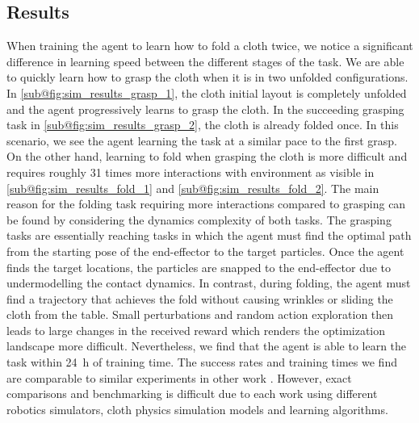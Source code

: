 \documentclass[\home/main.tex]{subfiles}
\begin{document}
\subsection{Results}
When training the agent to learn how to fold a cloth twice, we notice a significant difference in learning speed between the different stages of the task. We are able to quickly learn how to grasp the cloth when it is in two unfolded configurations. In \cref{sub@fig:sim_results_grasp_1}, the cloth initial layout is completely unfolded and the agent progressively learns to grasp the cloth. In the succeeding grasping task in \cref{sub@fig:sim_results_grasp_2}, the cloth is already folded once. In this scenario, we see the agent learning the task at a similar pace to the first grasp. On the other hand, learning to fold when grasping the cloth is more difficult and requires roughly 31 times more interactions with environment as visible in \cref{sub@fig:sim_results_fold_1} and \cref{sub@fig:sim_results_fold_2}. The main reason for the folding task requiring more interactions compared to grasping can be found by considering the dynamics complexity of both tasks. The grasping tasks are essentially reaching tasks in which the agent must find the optimal path from the starting pose of the end-effector to the target particles. Once the agent finds the target locations, the particles are snapped to the end-effector due to undermodelling the contact dynamics. In contrast, during folding, the agent must find a trajectory that achieves the fold without causing wrinkles or sliding the cloth from the table. Small perturbations and random action exploration then leads to large changes in the received reward which renders the optimization landscape more difficult. Nevertheless, we find that the agent is able to learn the task within \qty{24}{\hour} of training time.
The success rates and training times we find are comparable to similar experiments in other work \autocite{Matas2018,Jangir2020}. However, exact comparisons and benchmarking is difficult due to each work using different robotics simulators, cloth physics simulation models and learning algorithms.
\end{document}
